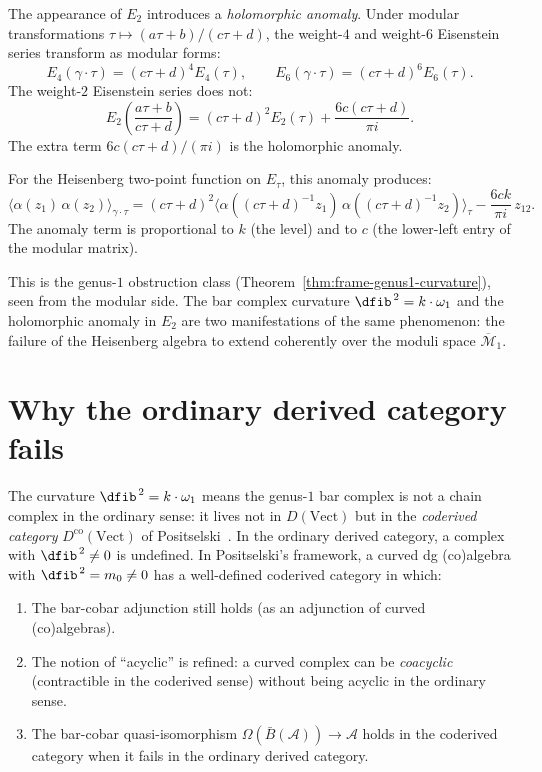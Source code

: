 The appearance of $E_2$ introduces a \emph{holomorphic anomaly}.
Under modular transformations $\tau \mapsto (a\tau+b)/(c\tau+d)$,
the weight-$4$ and weight-$6$ Eisenstein series transform as
modular forms:
\[
E_4(\gamma \cdot \tau) = (c\tau+d)^4 E_4(\tau), \qquad
E_6(\gamma \cdot \tau) = (c\tau+d)^6 E_6(\tau).
\]
The weight-$2$ Eisenstein series does not:
\begin{equation}\label{eq:frame-E2-anomaly}
E_2\!\left(\frac{a\tau+b}{c\tau+d}\right)
= (c\tau+d)^2 E_2(\tau) + \frac{6c(c\tau+d)}{\pi i}.
\end{equation}
The extra term $6c(c\tau+d)/(\pi i)$ is the holomorphic anomaly.

For the Heisenberg two-point function on $E_\tau$, this anomaly
produces:
\begin{equation}\label{eq:frame-2pt-anomaly}
\langle \alpha(z_1)\, \alpha(z_2) \rangle_{\gamma \cdot \tau}
= (c\tau+d)^2
 \langle \alpha((c\tau+d)^{-1}z_1)\,
 \alpha((c\tau+d)^{-1}z_2) \rangle_\tau
 - \frac{6ck}{\pi i}\, z_{12}.
\end{equation}
The anomaly term is proportional to $k$ (the level) and to $c$
(the lower-left entry of the modular matrix).

This is the genus-$1$ obstruction class
(Theorem~\ref{thm:frame-genus1-curvature}), seen from the modular
side. The bar complex curvature $\dfib^{\,2} = k \cdot \omega_1$ and the
holomorphic anomaly in $E_2$ are two manifestations of the same
phenomenon: the failure of the Heisenberg algebra to extend
coherently over the moduli space $\overline{\mathcal{M}}_1$.

\section{Why the ordinary derived category fails}
\label{sec:frame-coderived}

The curvature $\dfib^{\,2} = k \cdot \omega_1$ means the genus-$1$ bar
complex is not a chain complex in the ordinary sense: it lives not in
$D(\mathrm{Vect})$ but in the \emph{coderived category}
$D^{\mathrm{co}}(\mathrm{Vect})$ of
Positselski~\cite{Positselski11}. In the ordinary derived category, a
complex with $\dfib^{\,2} \neq 0$ is undefined. In Positselski's
framework, a curved dg (co)algebra with $\dfib^{\,2} = m_0 \neq 0$ has
a well-defined coderived category in which:
\begin{enumerate}
\item The bar-cobar adjunction still holds (as an adjunction of
 curved (co)algebras).
\item The notion of ``acyclic'' is refined: a curved complex can
 be \emph{coacyclic} (contractible in the coderived sense) without
 being acyclic in the ordinary sense.
\item The bar-cobar quasi-isomorphism
 $\Omega(\bar{B}(\mathcal{A})) \to \mathcal{A}$ holds in the
 coderived category when it fails in the ordinary derived category.
\end{enumerate}

